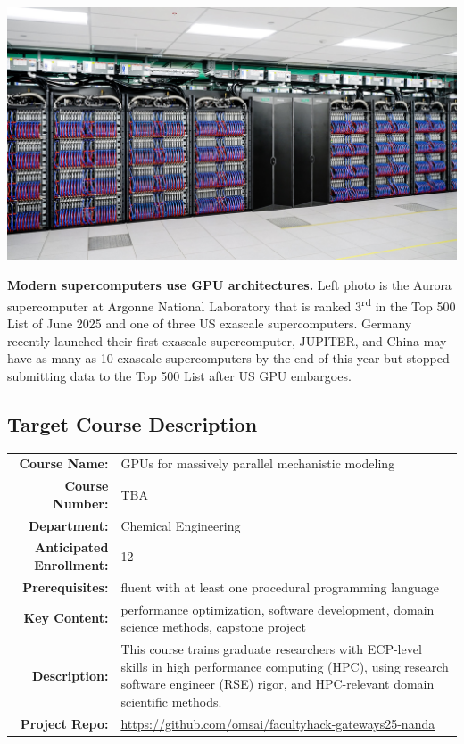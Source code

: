 \documentclass{article}
\begin{document}
\begin{tcbposter}
{  \noindent
  \begin{minipage}[c]{.36\linewidth}
    \includegraphics[width=\linewidth]{1920x1080-Aurora hero image.jpg}
  \end{minipage}
  \begin{minipage}[c]{.62\linewidth}
    \textbf{Modern supercomputers use GPU architectures.}
    Left photo is the Aurora supercomputer at Argonne National Laboratory %
    that is ranked 3\textsuperscript{rd} in the Top 500 List of June 2025 %
    and one of three US exascale supercomputers.
    Germany recently launched their first exascale supercomputer, JUPITER, %
    and China may have as many as 10 exascale supercomputers %
    by the end of this year\supercite{dongarra_2023} %
    but stopped submitting data to the Top 500 List %
    after US GPU embargoes.
  \end{minipage}

  \subsection*{\textcolor{fh-blue}{Target Course Description}}

  {
    \begin{tabularx}{\linewidth}{>{\bfseries}r X}
      \toprule
      Course Name:
      & GPUs for massively parallel mechanistic modeling\\
      Course Number:
      & TBA\\
      Department:
      & Chemical Engineering\\
      Anticipated Enrollment:
      & 12\\
      Prerequisites:
      & fluent with at least one %
      procedural programming language\\
      Key Content:
      & performance optimization, %
      software development, %
      domain science methods, %
      capstone project\\
      Description:
      & This course trains graduate researchers %
      with ECP-level skills in high performance computing (HPC), %
      using research software engineer (RSE) rigor, %
      and HPC-relevant domain scientific methods.\\
      Project Repo:
      & \small \url{https://github.com/omsai/facultyhack-gateways25-nanda}\\
      \bottomrule
    \end{tabularx}
  }

}
\end{tcbposter}
\end{document}
